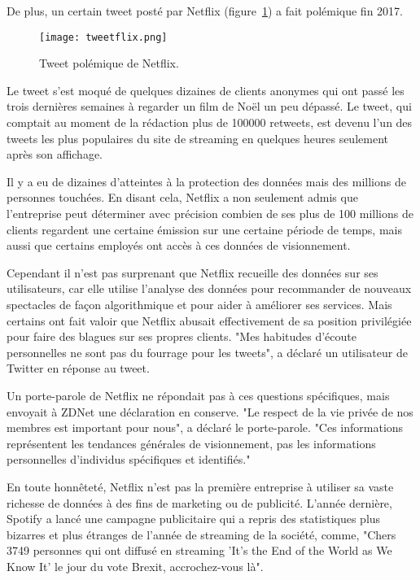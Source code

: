 \documentclass[a4paper,14pt]{extreport}
\begin{document}
De plus, un certain tweet posté par Netflix (figure~\ref{tweetflix}) a fait polémique fin 2017.

\begin{figure}[ht]
 \begin{center}
  \texttt{[image: tweetflix.png]}
 \end{center}
    \caption{Tweet polémique de Netflix.}
 \label{tweetflix}
\end{figure}

Le tweet s'est moqué de quelques dizaines de clients anonymes qui ont passé les trois dernières semaines à regarder un film de Noël un peu dépassé. Le tweet, qui comptait au moment de la rédaction plus de 100000 retweets, est devenu l'un des tweets les plus populaires du site de streaming en quelques heures seulement après son affichage.

Il y a eu de dizaines d'atteintes à la protection des données mais des millions de personnes touchées. En disant cela, Netflix a non seulement admis que l'entreprise peut déterminer avec précision combien de ses plus de 100 millions de clients regardent une certaine émission sur une certaine période de temps, mais aussi que certains employés ont accès à ces données de visionnement.

Cependant il n'est pas surprenant que Netflix recueille des données sur ses utilisateurs, car elle utilise l'analyse des données pour recommander de nouveaux spectacles de façon algorithmique et pour aider à améliorer ses services. Mais certains ont fait valoir que Netflix abusait effectivement de sa position privilégiée pour faire des blagues sur ses propres clients. "Mes habitudes d'écoute personnelles ne sont pas du fourrage pour les tweets", a déclaré un utilisateur de Twitter en réponse au tweet.

Un porte-parole de Netflix ne répondait pas à ces questions spécifiques, mais envoyait à ZDNet une déclaration en conserve. "Le respect de la vie privée de nos membres est important pour nous", a déclaré le porte-parole. "Ces informations représentent les tendances générales de visionnement, pas les informations personnelles d'individus spécifiques et identifiés."

En toute honnêteté, Netflix n'est pas la première entreprise à utiliser sa vaste richesse de données à des fins de marketing ou de publicité. L'année dernière, Spotify a lancé une campagne publicitaire qui a repris des statistiques plus bizarres et plus étranges de l'année de streaming de la société, comme, "Chers 3749 personnes qui ont diffusé en streaming 'It's the End of the World as We Know It' le jour du vote Brexit, accrochez-vous là".
\end{document}
